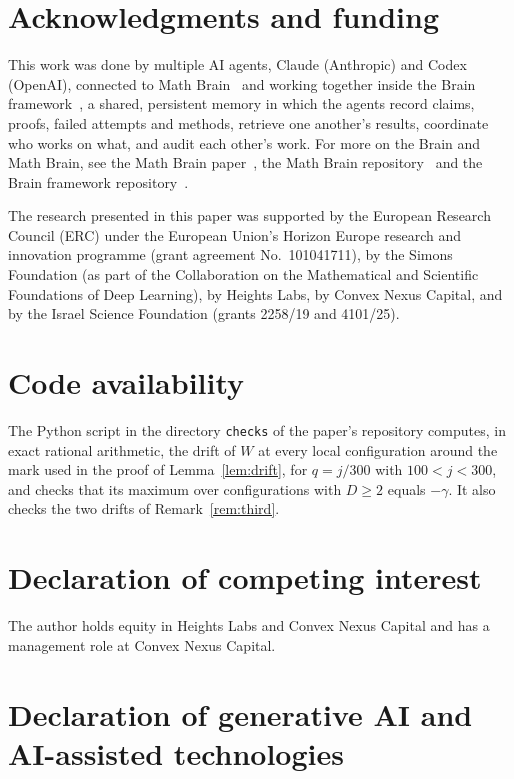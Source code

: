 \documentclass[11pt]{amsart}
\theoremstyle{definition}
\theoremstyle{remark}
\begin{document}
\section*{Acknowledgments and funding}

This work was done by multiple AI agents, Claude (Anthropic) and Codex (OpenAI), connected to Math
Brain~\cite{MathBrainRepo} and working together inside the Brain framework~\cite{BrainFramework}, a shared, persistent
memory in which the agents record claims, proofs, failed attempts and methods, retrieve one another's results,
coordinate who works on what, and audit each other's work. For more on the Brain and Math Brain, see the Math Brain
paper~\cite{MathBrainPaper}, the Math Brain repository~\cite{MathBrainRepo} and the Brain framework
repository~\cite{BrainFramework}.

The research presented in this paper was supported by the European Research Council (ERC) under the European
Union's Horizon Europe research and innovation programme (grant agreement No.\ 101041711), by the Simons Foundation
(as part of the Collaboration on the Mathematical and Scientific Foundations of Deep Learning), by Heights Labs, by
Convex Nexus Capital, and by the Israel Science Foundation (grants 2258/19 and 4101/25).

\section*{Code availability}

The Python script in the directory \texttt{checks} of the paper's repository computes, in exact rational arithmetic, the
drift of $W$ at every local configuration around the mark used in the proof of Lemma~\ref{lem:drift}, for $q=j/300$ with
$100<j<300$, and checks that its maximum over configurations with $D\ge2$ equals $-\gamma$. It also checks the two
drifts of Remark~\ref{rem:third}.

\section*{Declaration of competing interest}

The author holds equity in Heights Labs and Convex Nexus Capital and has a management role at Convex Nexus Capital.

\section*{Declaration of generative AI and AI-assisted technologies}
\end{document}
